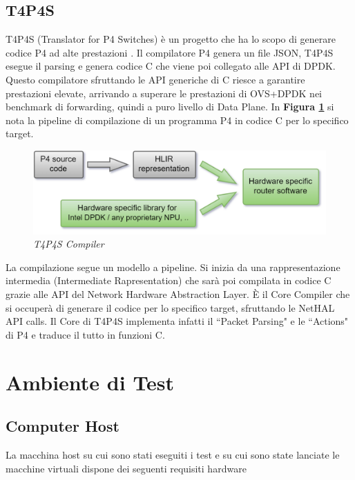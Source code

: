 \subsection*{T4P4S}
T4P4S (Translator for P4 Switches) è un progetto che ha lo scopo di generare codice P4 ad alte prestazioni \cite{noauthor_p4elte_nodate}. Il compilatore P4 genera un file JSON, T4P4S esegue il parsing e genera codice C che viene poi collegato alle API di DPDK. Questo compilatore sfruttando le API generiche di C riesce a garantire prestazioni elevate, arrivando a superare le prestazioni di OVS+DPDK nei benchmark di forwarding, quindi a puro livello di Data Plane.
In \textbf{{Figura \ref{fig:t4p4s}}} si nota la pipeline di compilazione di un programma P4 in codice C per lo specifico target.
\FloatBarrier
\vspace{1cm}
\begin{figure}[h]
\includegraphics[scale=0.40]{images/t4p4s.png}
\centering
\caption{\textit{T4P4S Compiler}}
\label{fig:t4p4s}
\end{figure}
\FloatBarrier
\leavevmode\newline
La compilazione segue un modello a pipeline. Si inizia da una rappresentazione intermedia (Intermediate Rapresentation) che sarà poi compilata in codice C grazie alle API del Network Hardware Abstraction Layer. È il Core Compiler che si occuperà di generare il codice per lo specifico target, sfruttando le NetHAL API calls. Il Core di T4P4S implementa infatti il ``Packet Parsing" e le ``Actions" di P4 e traduce il tutto in funzioni C.

\pagebreak

\section*{Ambiente di Test}

\subsection*{Computer Host}
La macchina host su cui sono stati eseguiti i test e su cui sono state lanciate le macchine virtuali dispone dei seguenti requisiti hardware

